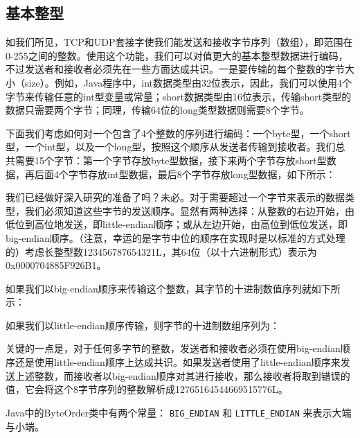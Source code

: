 	\subsection{基本整型} 

		如我们所见，TCP和UDP套接字使我们能发送和接收字节序列（数组），即范围在0-255之间的整数。使用这个功能，我们可以对值更大的基本整型数据进行编码，不过发送者和接收者必须先在一些方面达成共识。一是要传输的每个整数的字节大小（size）。例如，Java程序中，int数据类型由32位表示，因此，我们可以使用4个字节来传输任意的int型变量或常量；short数据类型由16位表示，传输short类型的数据只需要两个字节；同理，传输64位的long类型数据则需要8个字节。 

		下面我们考虑如何对一个包含了4个整数的序列进行编码：一个byte型，一个short型，一个int型，以及一个long型，按照这个顺序从发送者传输到接收者。我们总共需要15个字节：第一个字节存放byte型数据，接下来两个字节存放short型数据，再后面4个字节存放int型数据，最后8个字节存放long型数据，如下所示： 

		

		我们已经做好深入研究的准备了吗？未必。对于需要超过一个字节来表示的数据类型，我们必须知道这些字节的发送顺序。显然有两种选择：从整数的右边开始，由低位到高位地发送，即little-endian顺序；或从左边开始，由高位到低位发送，即big-endian顺序。（注意，幸运的是字节中位的顺序在实现时是以标准的方式处理的）考虑长整型数123456787654321L，其64位（以十六进制形式）表示为0x0000704885F926B1。
		
		如果我们以big-endian顺序来传输这个整数，其字节的十进制数值序列就如下所示： 

		

		如果我们以little-endian顺序传输，则字节的十进制数组序列为： 

		

		关键的一点是，对于任何多字节的整数，发送者和接收者必须在使用big-endian顺序还是使用little-endian顺序上达成共识。如果发送者使用了little-endian顺序来发送上述整数，而接收者以big-endian顺序对其进行接收，那么接收者将取到错误的值，它会将这个8字节序列的整数解析成12765164544669515776L。 

		Java中的ByteOrder类中有两个常量： \verb|BIG_ENDIAN| 和 \verb|LITTLE_ENDIAN| 来表示大端与小端。

